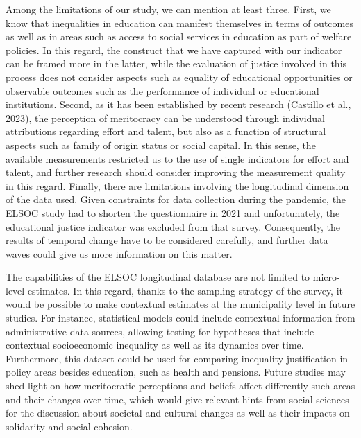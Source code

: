 \documentclass[
  12pt,
  a4paper,
]{article}
\begin{document}
Among the limitations of our study, we can mention at least three.
First, we know that inequalities in education can manifest themselves in
terms of outcomes as well as in areas such as access to social services
in education as part of welfare policies. In this regard, the construct
that we have captured with our indicator can be framed more in the
latter, while the evaluation of justice involved in this process does
not consider aspects such as equality of educational opportunities or
observable outcomes such as the performance of individual or educational
institutions. Second, as it has been established by recent research
(\protect\hyperlink{ref-castillo_multidimensional_2023}{Castillo et al.,
2023}), the perception of meritocracy can be understood through
individual attributions regarding effort and talent, but also as a
function of structural aspects such as family of origin status or social
capital. In this sense, the available measurements restricted us to the
use of single indicators for effort and talent, and further research
should consider improving the measurement quality in this regard.
Finally, there are limitations involving the longitudinal dimension of
the data used. Given constraints for data collection during the
pandemic, the ELSOC study had to shorten the questionnaire in 2021 and
unfortunately, the educational justice indicator was excluded from that
survey. Consequently, the results of temporal change have to be
considered carefully, and further data waves could give us more
information on this matter.

The capabilities of the ELSOC longitudinal database are not limited to
micro-level estimates. In this regard, thanks to the sampling strategy
of the survey, it would be possible to make contextual estimates at the
municipality level in future studies. For instance, statistical models
could include contextual information from administrative data sources,
allowing testing for hypotheses that include contextual socioeconomic
inequality as well as its dynamics over time. Furthermore, this dataset
could be used for comparing inequality justification in policy areas
besides education, such as health and pensions. Future studies may shed
light on how meritocratic perceptions and beliefs affect differently
such areas and their changes over time, which would give relevant hints
from social sciences for the discussion about societal and cultural
changes as well as their impacts on solidarity and social cohesion.

\pagebreak
\end{document}
